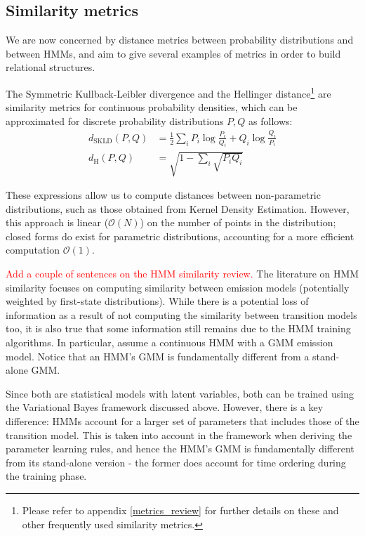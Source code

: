 \documentclass[pdftex,11pt,a4paper]{article}
\theoremstyle{definition}
\theoremstyle{remark}
\begin{document}
\subsection{Similarity metrics}
We are now concerned by distance metrics between probability distributions and between HMMs, and aim to give several examples of metrics in order to build relational structures.
\par The Symmetric Kullback-Leibler divergence and the Hellinger distance\footnote{Please refer to appendix \ref{metrics_review} for further details on these and other frequently used similarity metrics.} are similarity metrics for continuous probability densities, which can be approximated for discrete probability distributions $P, Q$ as follows:
\begin{align*}
d_{\text{SKLD}}(P, Q) &= \frac{1}{2}\sum_iP_i\log{\frac{P_i}{Q_i}} + Q_i\log{\frac{Q_i}{P_i}}\\
d_{\text{H}}(P, Q) &= \sqrt{1 - \sum_i \sqrt{P_iQ_i}}
\end{align*}
\par These expressions allow us to compute distances between non-parametric distributions, such as those obtained from Kernel Density Estimation. However, this approach is linear ($\mathcal{O}(N)$) on the number of points in the distribution; closed forms do exist for parametric distributions, accounting for a more efficient computation $\mathcal{O}(1)$. 
\par \textcolor{red}{Add a couple of sentences on the HMM similarity review.} The literature on HMM similarity focuses on computing similarity between emission models (potentially weighted by first-state distributions). While there is a potential loss of information as a result of not computing the similarity between transition models too, it is also true that some information still remains due to the HMM training algorithms. In particular, assume a continuous HMM with a GMM emission model. Notice that an HMM's GMM is fundamentally different from a stand-alone GMM.
\par Since both are statistical models with latent variables, both can be trained using the Variational Bayes framework discussed above. However, there is a key difference: HMMs account for a larger set of parameters that includes those of the transition model. This is taken into account in the framework when deriving the parameter learning rules, and hence the HMM's GMM is fundamentally different from its stand-alone version - the former does account for time ordering during the training phase.
\end{document}

